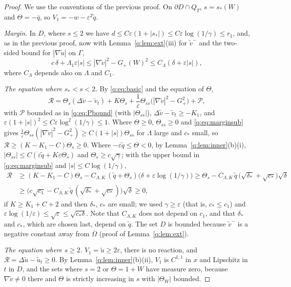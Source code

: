 \documentclass[11pt]{amsart}
\theoremstyle{definition}
\theoremstyle{remark}
\newcommand{\ve}{\varepsilon}
\begin{document}
\begin{proof}
We use the conventions of the previous proof. On $\partial D\cap Q_T$, $s=s_*(W)$ and
$\Theta=-\bar q$, so $V_1=-w-\ve^2\tilde q$.

\emph{Margin.} In $D$, where $s\le2$ we have
$d\le C\ve(1+|s_*|)\le C\ve\log(1/\gamma)\le r_1$, and, as in the previous proof, now with
Lemma~\ref{q:lem:ext}(iii) for $\tilde v^-$ and the two-sided bound for $|\nabla\tilde u|$ on
$\Gamma$,
\begin{equation}\label{q:eq:marginsub}
c\,\delta+\Lambda_1\ve|s|\le|\nabla\tilde v|^2-G_+(W)^2\le C_\Lambda(\delta+\ve|s|),
\end{equation}
where $C_\Lambda$ depends also on $\Lambda$ and $C_1$.

\emph{The equation where $s_*<s<2$.} By \eqref{q:eq:basic} and the equation of $\Theta$,
\[
\mathcal R=\Theta_s(\Delta\tilde v-\tilde v_t)+K\Theta_s+\frac1\ve\Theta_{ss}\big(|\nabla\tilde v|^2-G_+^2\big)+\mathcal P ,
\]
with $\mathcal P$ bounded as in \eqref{q:eq:Pbound} (with $|\Theta_{ss}|$), $\Delta\tilde v-\tilde v_t\ge-K_1$,
and $\ve(1+|s|)^2\le C\ve\log^2(1/\gamma)\le1$. Where $\Theta\ge0$, $\Theta_{ss}\ge0$ and
\eqref{q:eq:marginsub} gives
$\frac1\ve\Theta_{ss}(|\nabla\tilde v|^2-G_+^2)\ge C(1+|s|)\Theta_{ss}$ for $\Lambda$ large and $c_*$
small, so $\mathcal R\ge(K-K_1-C)\Theta_s\ge0$. Where $-\ve\tilde q\le\Theta<0$, by
Lemma~\ref{q:lem:inner}(b)(i), $|\Theta_{ss}|\le C(\ve\tilde q+K\ve\Theta_s)$ and
$\Theta_s\ge c\sqrt\gamma$; with the upper bound in \eqref{q:eq:marginsub} and
$|s|\le C\log(1/\gamma)$,
\begin{align*}
\mathcal R&\ge(K-K_1-C)\Theta_s-C_{\Lambda,K}\,(\tilde q+\Theta_s)\big(\delta+\ve\log(1/\gamma)\big)
\ge\Theta_s-C_{\Lambda,K}\,\tilde q\,\big(\sqrt{\delta_*}+\sqrt{c_*}\big)\sqrt\delta\\
&\ge\big(c\sqrt{c_1}-C_{\Lambda,K}\,\tilde q\,(\sqrt{\delta_*}+\sqrt{c_*})\big)\sqrt\delta\ge0,
\end{align*}
if $K\ge K_1+C+2$ and then $\delta_*$, $c_*$ are small; we used $\gamma\ge\ve$ (that is,
$c_*\le c_1$) and
$\ve\log(1/\ve)\le\sqrt{\ve}\le\sqrt{c_*\delta}$. Note that $C_{\Lambda,K}$ does not depend on
$c_1$, and that $\delta_*$ and $c_*$, which are chosen last, depend on $\tilde q$. The set $D$ is
bounded because $\tilde v^-$ is a negative constant away from $\overline\Omega$
(proof of Lemma~\ref{q:lem:ext}).

\emph{The equation where $s\ge2$.} $V_1=\tilde u\ge2\ve$, there is no reaction, and
$\mathcal R=\Delta\tilde u-\tilde u_t\ge0$. By Lemma~\ref{q:lem:inner}(b)(ii), $V_1$ is $C^{1,1}$ in
$x$ and Lipschitz in $t$ in $D$, and the sets where $s=2$ or $\Theta=1+W$ have measure zero,
because $\nabla\tilde v\ne0$ there and $\Theta$ is strictly increasing in $s$ with $|\Theta_W|$
bounded.


\end{proof}
\end{document}
